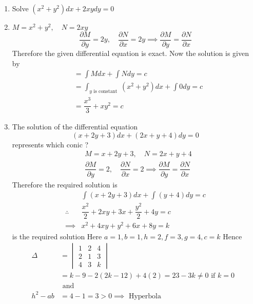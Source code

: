 \documentclass[a4paper, titlepage]{article}
\begin{document}
        \begin{enumerate}
            \item Solve $(x^2 + y^2)dx + 2xydy = 0$
            \item[] $M = x^2 + y^2 , \quad N = 2xy$
            $$\dfrac{\partial M}{\partial y} = 2y, \quad \dfrac{\partial N}{\partial x} = 2y \implies \dfrac{\partial M}{\partial y} = \dfrac{\partial N}{\partial x}$$
            Therefore the given differential equation is exact. Now the solution is given by
            \begin{align*}
                & = \displaystyle\int M dx + \displaystyle\int N dy = c \\
                & = \displaystyle\int_{y \text{ is constant }}(x^2 + y^2)dx + \displaystyle\int 0 dy = c \\
                & = \dfrac{x^3}{3} + xy^2 = c
            \end{align*}
            \item The solution of the differential equation $$(x + 2y + 3)dx + (2x + y + 4)dy = 0$$ represents which conic ?
            \begin{align*}
                & M = x + 2y + 3, \quad N = 2x + y + 4 \\
                & \dfrac{\partial M}{\partial y} = 2, \quad \dfrac{\partial N}{\partial x} = 2 \implies \dfrac{\partial M}{\partial y} = \dfrac{\partial N}{\partial x}
            \end{align*}
            Therefore the required solution is
            \begin{align*}
                & \displaystyle\int (x + 2y + 3)dx + \displaystyle\int (y + 4)dy = c \\
                \therefore & \dfrac{x^2}{2} + 2xy + 3x + \dfrac{y^2}{2} + 4y = c \\
                \implies & x^2 + 4xy + y^2 + 6x + 8y = k
            \end{align*}
            is the required solution
            Here $a = 1, b = 1, h = 2, f = 3, g = 4, c = k$
            Hence \begin{align*}
                \Delta  &= 
                        \begin{vmatrix}
                            1 & 2 & 4 \\
                            2 & 1 & 3 \\
                            4 & 3 & k
                        \end{vmatrix} \\
                        &= k - 9 -2(2k - 12) + 4(2) = 23 - 3k \neq 0 \text{ if $k = 0$ } \\
                        & \text{ and } \\
                h^2 - ab &= 4 - 1 = 3 > 0 \implies \text{ Hyperbola }
            \end{align*}
        \end{enumerate}
\end{document}
